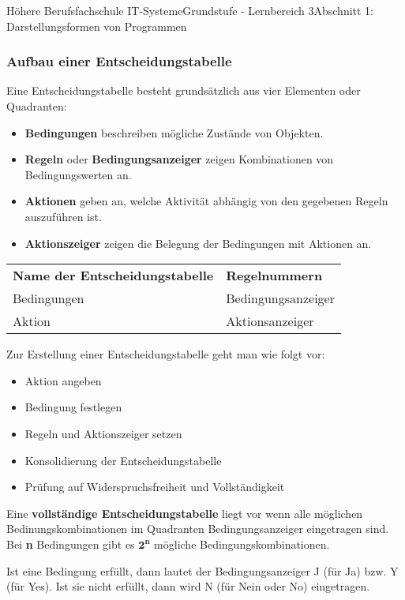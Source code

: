 \documentclass[11pt,oneside,openany,headings=optiontotoc,11pt,numbers=noenddot]{article}
\begin{document}
\begin{worksheet}{Höhere Berufsfachschule IT-Systeme}{Grundstufe - Lernbereich 3}{Abschnitt 1: Darstellungsformen von Programmen}
		\subsubsection{Aufbau einer Entscheidungstabelle}
		Eine Entscheidungstabelle besteht grundsätzlich aus vier Elementen oder Quadranten:
		\begin{itemize}[label=-]
			\item \textbf{Bedingungen} beschreiben mögliche Zustände von Objekten.
			\item \textbf{Regeln} oder \textbf{Bedingungsanzeiger} zeigen Kombinationen von Bedingungswerten an.
			\item \textbf{Aktionen} geben an, welche Aktivität abhängig von den gegebenen Regeln auszuführen ist.
			\item \textbf{Aktionszeiger} zeigen die Belegung der Bedingungen mit Aktionen an.
		\end{itemize}
		\begin{tabularx}{\textwidth}{|L{4cm}|L{4cm}|}
			\textbf{Name der Entscheidungstabelle} & \textbf{Regelnummern}\\
			Bedingungen & Bedingungsanzeiger\\
			Aktion & Aktionsanzeiger\\
		\end{tabularx}
		\newpage
		Zur Erstellung einer Entscheidungstabelle geht man wie folgt vor:
		\begin{itemize}[label=-]
			\item Aktion angeben
			\item Bedingung festlegen
			\item Regeln und Aktionszeiger setzen
			\item Konsolidierung der Entscheidungstabelle
			\item Prüfung auf Widerspruchsfreiheit und Vollständigkeit
		\end{itemize}
		Eine \textbf{vollständige Entscheidungstabelle} liegt vor wenn alle möglichen Bedinungskombinationen im Quadranten \grqq{}Bedingungsanzeiger\grqq{} eingetragen sind. Bei \textbf{n} Bedingungen gibt es \(\mathbf{2^n}\) mögliche Bedingungskombinationen.\\
		\par\noindent
		Ist eine Bedingung erfüllt, dann lautet der Bedingungsanzeiger J (für Ja) bzw. Y (für Yes). Ist sie nicht erfüllt, dann wird N (für Nein oder No) eingetragen.\\
		\par\noindent

\end{worksheet}
\end{document}
